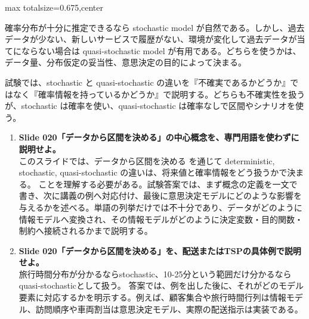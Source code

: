 \begin{adjustbox}{max totalsize={\textwidth}{0.675\textheight},center}
\begin{minipage}{\textwidth}
\begin{minipage}[t]{0.485\textwidth}
確率分布が十分に推定できるなら stochastic model が自然である。しかし、過去データが少ない、新しいサービスで履歴がない、環境が変化して過去データが当てにならない場合は quasi-stochastic model が有用である。どちらを使うかは、データ量、分布仮定の妥当性、意思決定の目的によって決まる。\par
試験では、stochastic と quasi-stochastic の違いを『不確実であるかどうか』ではなく『確率情報を持っているかどうか』で説明する。どちらも不確実性を扱うが、stochastic は確率を使い、quasi-stochastic は確率なしで区間やシナリオを使う。\par
{}
\begin{enumerate}
\item \textbf{Slide 020「データから区間を決める」の中心概念を、専門用語を使わずに説明せよ。}\\このスライドでは、データから区間を決める を通じて deterministic, stochastic, quasi-stochastic の違いは、将来値と確率情報をどう扱うかで決まる。 ことを理解する必要がある。試験答案では、まず概念の定義を一文で書き、次に講義の例へ対応付け、最後に意思決定モデルにどのような影響を与えるかを述べる。単語の列挙だけでは不十分であり、データがどのように情報モデルへ変換され、その情報モデルがどのように決定変数・目的関数・制約へ接続されるかまで説明する。
\item \textbf{Slide 020「データから区間を決める」を、配送またはTSPの具体例で説明せよ。}\\旅行時間分布が分かるならstochastic、10-25分という範囲だけ分かるならquasi-stochasticとして扱う。 答案では、例を出した後に、それがどのモデル要素に対応するかを明示する。例えば、顧客集合や旅行時間行列は情報モデル、訪問順序や車両割当は意思決定モデル、実際の配送指示は実装である。
\end{enumerate}
\end{minipage}
\end{minipage}
\end{adjustbox}

